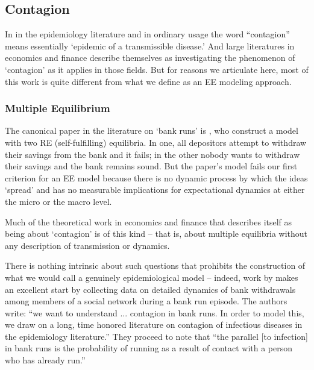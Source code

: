 
\subsection{Contagion}\label{subsec:Contagion}

In in the epidemiology literature and in ordinary usage the word ``contagion'' means essentially `epidemic of a transmissible disease.'  And large literatures in economics and finance describe themselves as investigating the phenomenon of `contagion' as it applies in those fields.  But for reasons we articulate here, most of this work is quite different from what we define as an EE modeling approach.

\subsubsection{Multiple Equilibrium}\label{subsubsec:multipleEqulibrium}

The canonical paper in the literature on `bank runs' is \href{https://www.jstor.org/stable/1837095}{\cite{diamond_bank_1983}}, who construct a model with two RE (self-fulfilling) equilibria.  In one, all depositors attempt to withdraw their savings from the bank and it fails; in the other nobody wants to withdraw their savings and the bank remains sound.  But the paper's model fails our first criterion for an EE model because there is no dynamic process by which the ideas `spread' and has no measurable implications for expectational dynamics at either the micro or the macro level.


Much of the theoretical work in economics and finance that describes itself as being about `contagion' is of this kind -- that is, about multiple equilibria without any description of transmission or dynamics.

There is nothing intrinsic about such questions that prohibits the construction of what we would call a genuinely epidemiological model -- indeed, work by \cite{iyer2012understanding} makes an excellent start by collecting data on detailed dynamics of bank withdrawals among members of a social network during a bank run episode.  The authors write:
``we want to understand ... contagion in bank runs. In order to model this, we draw on a long, time honored literature on contagion of infectious diseases in the epidemiology literature.''  They proceed to note that ``the parallel [to infection] in bank runs is the probability of running as a result of contact with a person who has already run.''

